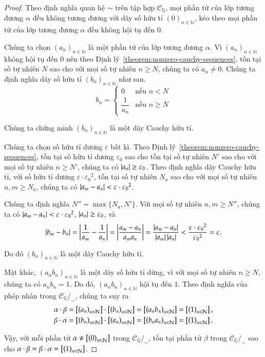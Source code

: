 \begin{proof}
    Theo định nghĩa quan hệ $\sim$ trên tập hợp $\mathscr{C}_{\mathbb{Q}}$, mọi phần tử của lớp tương đương $\alpha$ đều không tương đương với dãy số hữu tỉ ${(0)}_{n\in\mathbb{N}}$, kéo theo mọi phần tử của lớp tương đương $\alpha$ đều không hội tụ đến $0$.

    Chúng ta chọn ${(a_{n})}_{n\in\mathbb{N}}$ là một phần tử của lớp tương đương $\alpha$. Vì ${(a_{n})}_{n\in\mathbb{N}}$ không hội tụ đến $0$ nên theo Định lý~\ref{theorem:nonzero-cauchy-sequences}, tồn tại số tự nhiên $N$ sao cho với mọi số tự nhiên $n\geq N$, chúng ta có $a_{n}\ne 0$. Chúng ta định nghĩa dãy số hữu tỉ ${(b_{n})}_{n\in\mathbb{N}}$ như sau.
    \[
        b_{n} = \begin{cases}
            0                & \text{nếu $n < N$}   \\
            \dfrac{1}{a_{n}} & \text{nếu $n\geq N$}
        \end{cases}
    \]

    Chúng ta chứng minh ${(b_{n})}_{n\in\mathbb{N}}$ là một dãy Cauchy hữu tỉ.

    Chúng ta chọn số hữu tỉ dương $\varepsilon$ bất kì. Theo Định lý~\ref{theorem:nonzero-cauchy-sequences}, tồn tại số hữu tỉ dương $\varepsilon_{0}$ sao cho tồn tại số tự nhiên $N'$ sao cho với mọi số tự nhiên $n\geq N'$, chúng ta có $\left\vert{a_{n}}\right\vert\geq \varepsilon_{0}$. Theo định nghĩa dãy Cauchy hữu tỉ, với số hữu tỉ dương $\varepsilon\cdot{\varepsilon_{0}}^{2}$, tồn tại số tự nhiên $N_{a}$ sao cho với mọi số tự nhiên $n, m\geq N_{a}$, chúng ta có $\left\vert{a_{m} - a_{n}}\right\vert < \varepsilon\cdot{\varepsilon_{0}}^{2}$.

    Chúng ta định nghĩa $N'' = \max\{ N_{a}, N' \}$. Với mọi số tự nhiên $n, m\geq N''$, chúng ta có $\left\vert{a_{m} - a_{n}}\right\vert < \varepsilon\cdot{\varepsilon_{0}}^{2}$, $\left\vert{a_{n}}\right\vert\geq\varepsilon_{0}$, và
    \[
        \left\vert{b_{m} - b_{n}}\right\vert = \left\vert{\frac{1}{a_{m}} - \frac{1}{a_{n}}}\right\vert = \left\vert{\frac{a_{m} - a_{n}}{a_{m}a_{n}}}\right\vert = \frac{\left\vert{a_{m} - a_{n}}\right\vert}{\left\vert{a_{m}}\right\vert\left\vert{a_{n}}\right\vert} < \frac{\varepsilon\cdot{\varepsilon_{0}}^{2}}{{\varepsilon_{0}}^{2}} = \varepsilon.
    \]

    Do đó ${(b_{n})}_{n\in\mathbb{N}}$ là một dãy Cauchy hữu tỉ.

    Mặt khác, ${(a_{n}b_{n})}_{n\in\mathbb{N}}$ là một dãy số hữu tỉ dừng, vì với mọi số tự nhiên $n\geq N$, chúng ta có $a_{n}b_{n} = 1$. Do đó, ${(a_{n}b_{n})}_{n\in\mathbb{N}}$ hội tụ đến $1$. Theo định nghĩa của phép nhân trong $\mathscr{C}_{\mathbb{Q}}/_{\sim}$, chúng ta suy ra
    \[
        \begin{split}
            \alpha\cdot\beta = \left[{\left({a_{n}}\right)}_{{n}\in\mathbb{N}}\right]\cdot\left[{\left({b_{n}}\right)}_{{n}\in\mathbb{N}}\right] = \left[{\left({a_{n}b_{n}}\right)}_{{n}\in\mathbb{N}}\right] = \left[{\left({1}\right)}_{{n}\in\mathbb{N}}\right], \\
            \beta\cdot\alpha = \left[{\left({b_{n}}\right)}_{{n}\in\mathbb{N}}\right]\cdot\left[{\left({a_{n}}\right)}_{{n}\in\mathbb{N}}\right] = \left[{\left({b_{n}a_{n}}\right)}_{{n}\in\mathbb{N}}\right] = \left[{\left({1}\right)}_{{n}\in\mathbb{N}}\right].
        \end{split}
    \]

    Vậy, với mỗi phần tử $\alpha\ne \left[{\left({0}\right)}_{{n}\in\mathbb{N}}\right]$ trong $\mathscr{C}_{\mathbb{Q}}/_{\sim}$, tồn tại phần tử $\beta$ trong $\mathscr{C}_{\mathbb{Q}}/_{\sim}$ sao cho $\alpha\cdot\beta = \beta\cdot\alpha = \left[{\left({1}\right)}_{{n}\in\mathbb{N}}\right]$.
\end{proof}

